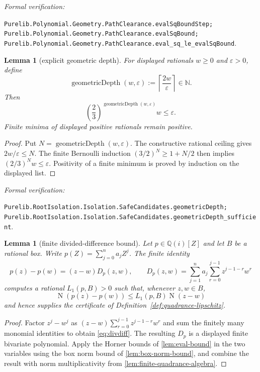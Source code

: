 \documentclass[11pt]{article}
\newtheorem{lemma}[theorem]{Lemma}
\newcommand{\Qi}{\mathbb{Q}(i)}
\newcommand{\N}{\mathbb{N}}
\newcommand{\Norm}[1]{\operatorname{N}\!\left(#1\right)}
\newcommand{\eps}{\varepsilon}
\newcommand{\Defref}[1]{Definition~\ref{#1}}
\newcommand{\leanref}[1]{\par\smallskip\noindent
  \emph{Formal verification:}\par\nobreak
  {\raggedright\nolinkurl{#1}.\par}}
\begin{document}
\leanref{Purelib.Polynomial.Geometry.PathClearance.evalSqBoundStep;
Purelib.Polynomial.Geometry.PathClearance.evalSqBound;
Purelib.Polynomial.Geometry.PathClearance.eval_sq_le_evalSqBound}

\begin{lemma}[explicit geometric depth]
\label{lem:reciprocal-search}
For displayed rationals $w\ge0$ and $\eps>0$, define
\[
 \operatorname{geometricDepth}(w,\eps)
       :=\left\lceil\frac{2w}{\eps}\right\rceil\in\N.
\]
Then
\[
 \left(\frac23\right)^{\operatorname{geometricDepth}(w,\eps)}w
       \le\eps.
\]
Finite minima of displayed positive rationals remain positive.
\end{lemma}

\begin{proof}
Put $N=\operatorname{geometricDepth}(w,\eps)$.
The constructive rational ceiling gives $2w/\eps\le N$.  The finite
Bernoulli induction
$(3/2)^N\ge1+N/2$ then implies
$(2/3)^Nw\le\eps$.  Positivity of a finite minimum is proved by induction on
the displayed list.
\end{proof}

\leanref{Purelib.RootIsolation.Isolation.SafeCandidates.geometricDepth;
Purelib.RootIsolation.Isolation.SafeCandidates.geometricDepth_sufficient}

\begin{lemma}[finite divided-difference bound]
\label{lem:divided-difference-bound}
Let $p\in\Qi[Z]$ and let $B$ be a rational box.  Write
$p(Z)=\sum_{j=0}^{n}a_jZ^j$.  The finite identity
\begin{equation}
\label{eq:divdiff}
 p(z)-p(w)=(z-w)D_p(z,w),\qquad
 D_p(z,w)=\sum_{j=1}^{n}a_j\sum_{r=0}^{j-1}z^{j-1-r}w^r
\end{equation}
computes a rational $L_1(p,B)>0$ such that, whenever $z,w\in B$,
\begin{equation}
\label{eq:lip1}
 \Norm{p(z)-p(w)}\le L_1(p,B)\Norm{z-w}
\end{equation}
and hence supplies the certificate of
\Defref{def:quadrance-lipschitz}.
\end{lemma}

\begin{proof}
Factor $z^j-w^j$ as
$(z-w)\sum_{r=0}^{j-1}z^{j-1-r}w^r$ and sum the finitely many monomial
identities to obtain \eqref{eq:divdiff}.  The resulting $D_p$ is a displayed
finite bivariate polynomial.  Apply the Horner bounds of
\cref{lem:eval-bound} in the two variables using the box norm bound of
\cref{lem:box-norm-bound}, and combine the result with norm
multiplicativity from \cref{lem:finite-quadrance-algebra}.
\end{proof}
\end{document}
